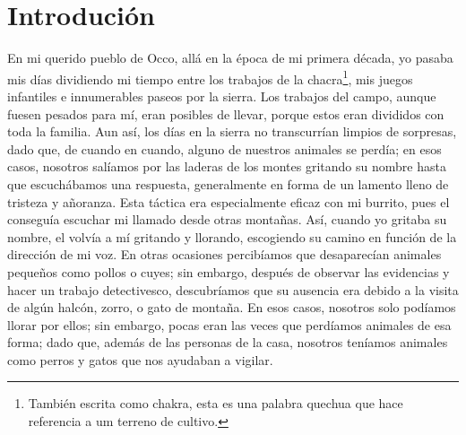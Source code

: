 \cleardoublepage
\newpage
{}
\chapter*{Introdución} %

En mi querido pueblo de Occo, allá en la época de mi primera década, yo pasaba mis días dividiendo mi tiempo entre los trabajos de la chacra\footnote{También escrita como chakra, esta es una palabra quechua que hace referencia a um terreno de cultivo.}, mis juegos infantiles e innumerables paseos por la sierra.
Los trabajos del campo, aunque fuesen pesados para mí, eran posibles de llevar, porque estos eran divididos con toda la familia. 
Aun así, los días en la sierra no transcurrían limpios de sorpresas, dado que, de cuando en cuando, alguno de nuestros animales se perdía; en esos casos, nosotros salíamos por las laderas de los montes gritando su nombre hasta que escuchábamos una respuesta, generalmente en forma de un lamento lleno de tristeza y añoranza.
Esta táctica era especialmente eficaz con mi burrito, pues el conseguía escuchar mi llamado desde otras montañas. Así, cuando yo gritaba su nombre, el volvía a mí gritando y llorando, escogiendo su camino en función de la dirección de mi voz.  
En otras ocasiones percibíamos que desaparecían animales pequeños como pollos o cuyes; sin embargo, después de observar las evidencias y hacer un trabajo detectivesco, descubríamos que su ausencia era debido a la visita de algún halcón, zorro, o gato de montaña.
En esos casos, nosotros solo podíamos llorar por ellos; sin embargo, pocas eran las veces que perdíamos animales de esa forma; dado que, además de las personas de la casa, nosotros teníamos animales como perros y gatos que nos ayudaban a vigilar.

